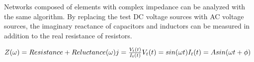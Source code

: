 \documentclass[11pt, a4paper]{article}
\begin{document}
Networks composed of elements with complex impedance can be analyzed with the same algorithm.
By replacing the test DC voltage sources with AC voltage sources, the imaginary reactance of capacitors and inductors can be measured in addition to the real resistance of resistors.

$
Z(\omega)=Resistance+Reluctance(\omega) j  = \frac{V_t(t)}{I_t(t)} \\
V_t(t) = sin(\omega t)\\
I_t(t) = A sin(\omega t + \phi)
$\\
\end{document}

